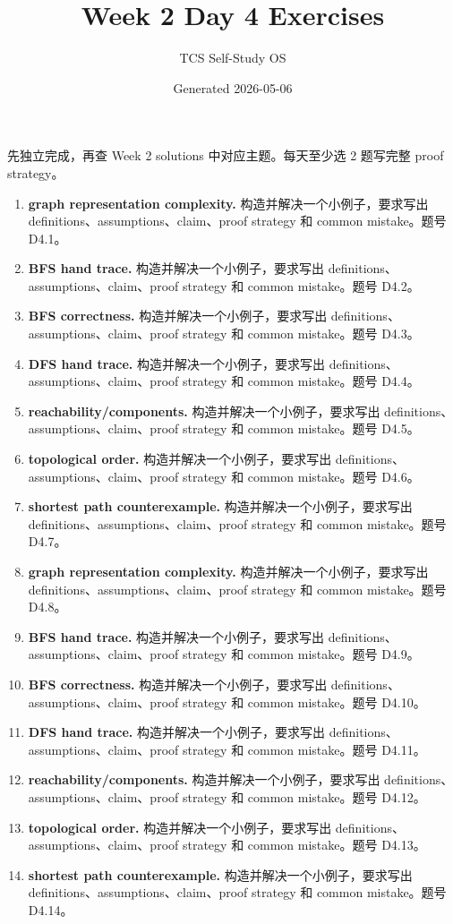 \documentclass[11pt]{ctexart}
\title{Week 2 Day 4 Exercises}
\author{TCS Self-Study OS}
\date{Generated 2026-05-06}
\begin{document}
\maketitle
先独立完成，再查 Week 2 solutions 中对应主题。每天至少选 2 题写完整 proof strategy。
\begin{enumerate}
  \item \textbf{graph representation complexity.} 构造并解决一个小例子，要求写出 definitions、assumptions、claim、proof strategy 和 common mistake。题号 D4.1。
  \item \textbf{BFS hand trace.} 构造并解决一个小例子，要求写出 definitions、assumptions、claim、proof strategy 和 common mistake。题号 D4.2。
  \item \textbf{BFS correctness.} 构造并解决一个小例子，要求写出 definitions、assumptions、claim、proof strategy 和 common mistake。题号 D4.3。
  \item \textbf{DFS hand trace.} 构造并解决一个小例子，要求写出 definitions、assumptions、claim、proof strategy 和 common mistake。题号 D4.4。
  \item \textbf{reachability/components.} 构造并解决一个小例子，要求写出 definitions、assumptions、claim、proof strategy 和 common mistake。题号 D4.5。
  \item \textbf{topological order.} 构造并解决一个小例子，要求写出 definitions、assumptions、claim、proof strategy 和 common mistake。题号 D4.6。
  \item \textbf{shortest path counterexample.} 构造并解决一个小例子，要求写出 definitions、assumptions、claim、proof strategy 和 common mistake。题号 D4.7。
  \item \textbf{graph representation complexity.} 构造并解决一个小例子，要求写出 definitions、assumptions、claim、proof strategy 和 common mistake。题号 D4.8。
  \item \textbf{BFS hand trace.} 构造并解决一个小例子，要求写出 definitions、assumptions、claim、proof strategy 和 common mistake。题号 D4.9。
  \item \textbf{BFS correctness.} 构造并解决一个小例子，要求写出 definitions、assumptions、claim、proof strategy 和 common mistake。题号 D4.10。
  \item \textbf{DFS hand trace.} 构造并解决一个小例子，要求写出 definitions、assumptions、claim、proof strategy 和 common mistake。题号 D4.11。
  \item \textbf{reachability/components.} 构造并解决一个小例子，要求写出 definitions、assumptions、claim、proof strategy 和 common mistake。题号 D4.12。
  \item \textbf{topological order.} 构造并解决一个小例子，要求写出 definitions、assumptions、claim、proof strategy 和 common mistake。题号 D4.13。
  \item \textbf{shortest path counterexample.} 构造并解决一个小例子，要求写出 definitions、assumptions、claim、proof strategy 和 common mistake。题号 D4.14。
\end{enumerate}
\end{document}
